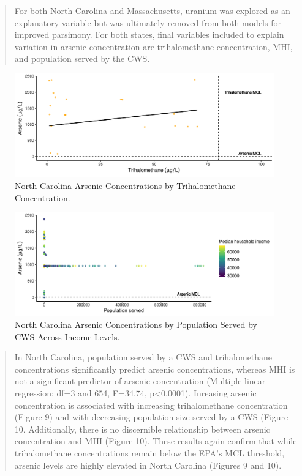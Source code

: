 \documentclass[12pt,]{article}
\begin{document}
\begin{quote}
For both North Carolina and Massachusetts, uranium was explored as an
explanatory variable but was ultimately removed from both models for
improved parsimony. For both states, final variables included to explain
variation in arsenic concentration are trihalomethane concentration,
MHI, and population served by the CWS.
\end{quote}

\begin{figure}
\centering
\includegraphics{Project_Template_files/figure-latex/figs9-1.pdf}
\caption{North Carolina Arsenic Concentrations by Trihalomethane
Concentration.}
\end{figure}

\begin{figure}
\centering
\includegraphics{Project_Template_files/figure-latex/figs10-1.pdf}
\caption{North Carolina Arsenic Concentrations by Population Served by
CWS Across Income Levels.}
\end{figure}

\begin{quote}
In North Carolina, population served by a CWS and trihalomethane
concentrations significantly predict arsenic concentrations, whereas MHI
is not a significant predictor of arsenic concentration (Multiple linear
regression; df=3 and 654, F=34.74, p\textless{}0.0001). Inreasing
arsenic concentration is associated with increasing trihalomethane
concentration (Figure 9) and with decreasing population size served by a
CWS (Figure 10. Additionally, there is no discernible relationship
between arsenic concentration and MHI (Figure 10). These results again
confirm that while trihalomethane concentrations remain below the EPA's
MCL threshold, arsenic levels are highly elevated in North Carolina
(Figures 9 and 10).
\end{quote}
\end{document}
